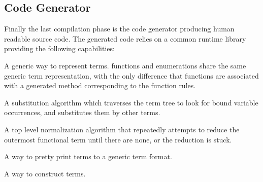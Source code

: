 \subsection{Code Generator} \label{sec:codegen}

Finally the last compilation phase is the code generator producing human
readable \java source code. The generated code relies on a common 
runtime \java library providing the following capabilities:
%
\begin{enumerate*} [label=\itshape(\roman*)]
\item \label{cap:fun} A generic way to represent terms. \Tosca functions and enumerations share the same
generic term representation, with the 
only difference that functions are associated 
with a generated \java method corresponding to the function rules. 
\item A substitution algorithm which traverses the term tree to look
  for bound variable occurrences, and substitutes them by other terms.
\item A top level normalization algorithm that repeatedly attempts to
  reduce the outermost functional term until there are none, or the
  reduction is stuck.
\item A way to pretty print terms to a generic term format. 
\item A way to construct terms. 
\end{enumerate*}

